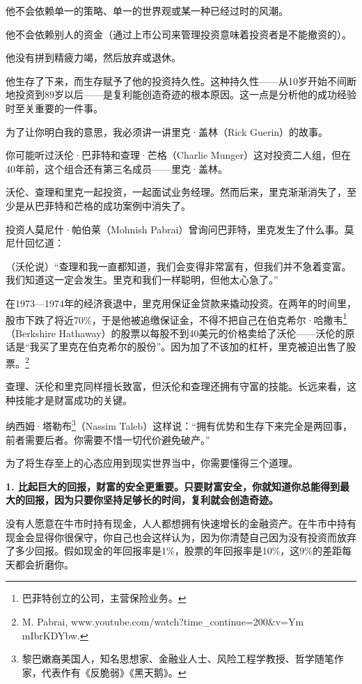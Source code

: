 他不会依赖单一的策略、单一的世界观或某一种已经过时的风潮。

他不会依赖别人的资金（通过上市公司来管理投资意味着投资者是不能撤资的）。

他没有拼到精疲力竭，然后放弃或退休。

他生存了下来，而生存赋予了他的投资持久性。这种持久性——从10岁开始不间断地投资到89岁以后——是复利能创造奇迹的根本原因。这一点是分析他的成功经验时至关重要的一件事。

为了让你明白我的意思，我必须讲一讲里克·盖林（Rick Guerin）的故事。

你可能听过沃伦·巴菲特和查理·芒格（Charlie Munger）这对投资二人组，但在40年前，这个组合还有第三名成员——里克·盖林。

沃伦、查理和里克一起投资，一起面试业务经理。然而后来，里克渐渐消失了，至少是从巴菲特和芒格的成功案例中消失了。

投资人莫尼什·帕伯莱（Mohnish Pabrai）曾询问巴菲特，里克发生了什么事。莫尼什回忆道：

{\kaishu

（沃伦说）“查理和我一直都知道，我们会变得非常富有，但我们并不急着变富。我们知道这一定会发生。里克和我们一样聪明，但他太心急了。”

在1973—1974年的经济衰退中，里克用保证金贷款来撬动投资。在两年的时间里，股市下跌了将近70\%，于是他被追缴保证金，不得不把自己在伯克希尔·哈撒韦\footnote{巴菲特创立的公司，主营保险业务。}（Berkshire Hathaway）的股票以每股不到40美元的价格卖给了沃伦——沃伦的原话是“我买了里克在伯克希尔的股份”。因为加了不该加的杠杆，里克被迫出售了股票。\footnote{M. Pabrai, www.youtube.com/watch?time\_continue=200\&v=Ym mIbrKDYbw.}

}

查理、沃伦和里克同样擅长致富，但沃伦和查理还拥有守富的技能。长远来看，这种技能才是财富成功的关键。

纳西姆·塔勒布\footnote{黎巴嫩裔美国人，知名思想家、金融业人士、风险工程学教授、哲学随笔作家，代表作有《反脆弱》《黑天鹅》。}（Nassim Taleb）这样说：“拥有优势和生存下来完全是两回事，前者需要后者。你需要不惜一切代价避免破产。”

为了将生存至上的心态应用到现实世界当中，你需要懂得三个道理。

 \textbf{1. 比起巨大的回报，财富的安全更重要。只要财富安全，你就知道你总能得到最大的回报，因为只要你坚持足够长的时间，复利就会创造奇迹。}

没有人愿意在牛市时持有现金，人人都想拥有快速增长的金融资产。在牛市中持有现金会显得你很保守，你自己也会这样认为，因为你清楚自己因为没有投资而放弃了多少回报。假如现金的年回报率是1\%，股票的年回报率是10\%，这9\%的差距每天都会折磨你。

